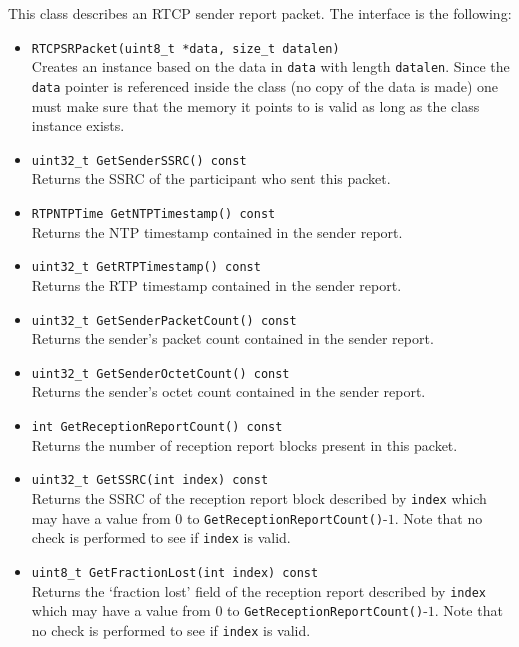 \documentclass[12pt,a4paper]{article}
\begin{document}
					This class describes an RTCP sender report packet. The interface
					is the following:
					\begin{itemize}
						\item {\tt RTCPSRPacket(uint8\_t *data, size\_t datalen)}\\
							Creates an instance based on the data in {\tt data} with
							length {\tt datalen}. Since the {\tt data} pointer
							is referenced inside the class (no copy of the data is
							made) one must make sure that the memory it points to is
							valid as long as the class instance exists.
						\item {\tt uint32\_t GetSenderSSRC() const}\\
							Returns the SSRC of the participant who sent this packet.
						\item {\tt RTPNTPTime GetNTPTimestamp() const}\\
							Returns the NTP timestamp contained in the sender report.
						\item {\tt uint32\_t GetRTPTimestamp() const}\\
							Returns the RTP timestamp contained in the sender report.
						\item {\tt uint32\_t GetSenderPacketCount() const}\\
							Returns the sender's packet count contained in the
							sender report.
						\item {\tt uint32\_t GetSenderOctetCount() const}\\
							Returns the sender's octet count contained in the sender
							report.
						\item {\tt int GetReceptionReportCount() const}\\
							Returns the number of reception report blocks present
							in this packet.
						\item {\tt uint32\_t GetSSRC(int index) const}\\
							Returns the SSRC of the reception report block described
							by {\tt index} which may have a value from $0$ to
							{\tt GetReceptionReportCount()}-$1$. Note that no
							check is performed to see if {\tt index} is valid.
						\item {\tt uint8\_t GetFractionLost(int index) const}\\
							Returns the `fraction lost' field of the reception 
							report described by {\tt index} which may have a value 
							from $0$ to {\tt GetReceptionReportCount()}-$1$. Note that 
							no check is performed to see if {\tt index} is valid.

\end{itemize}
\end{document}
